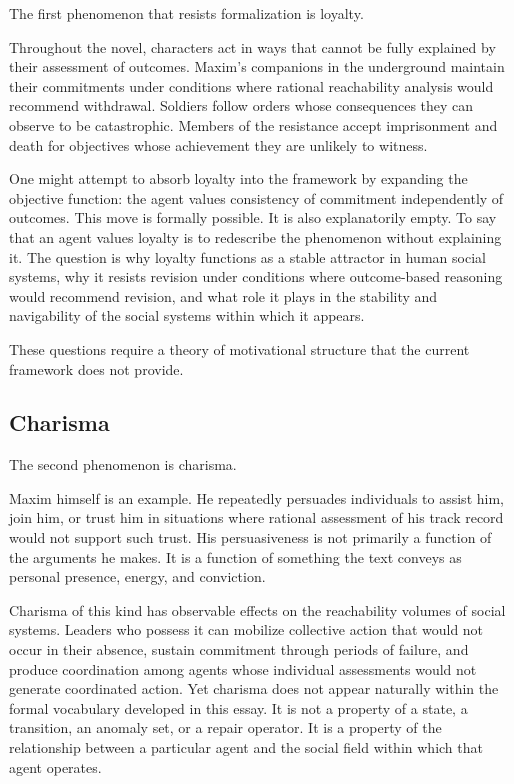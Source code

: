 \documentclass[12pt, a4paper]{article}
\theoremstyle{plain}
\theoremstyle{definition}
\theoremstyle{remark}
\begin{document}
The first phenomenon that resists formalization
is loyalty.

Throughout the novel, characters act in ways that
cannot be fully explained by their assessment of
outcomes. Maxim's companions in the underground
maintain their commitments under conditions where
rational reachability analysis would recommend
withdrawal. Soldiers follow orders whose
consequences they can observe to be catastrophic.
Members of the resistance accept imprisonment and
death for objectives whose achievement they are
unlikely to witness.

One might attempt to absorb loyalty into the
framework by expanding the objective function:
the agent values consistency of commitment
independently of outcomes. This move is formally
possible. It is also explanatorily empty. To say
that an agent values loyalty is to redescribe
the phenomenon without explaining it. The question
is why loyalty functions as a stable attractor in
human social systems, why it resists revision
under conditions where outcome-based reasoning
would recommend revision, and what role it plays
in the stability and navigability of the social
systems within which it appears.

These questions require a theory of motivational
structure that the current framework does not provide.

\subsection{Charisma}

The second phenomenon is charisma.

Maxim himself is an example. He repeatedly
persuades individuals to assist him, join him,
or trust him in situations where rational
assessment of his track record would not support
such trust. His persuasiveness is not primarily
a function of the arguments he makes. It is a
function of something the text conveys as personal
presence, energy, and conviction.

Charisma of this kind has observable effects on
the reachability volumes of social systems. Leaders
who possess it can mobilize collective action that
would not occur in their absence, sustain
commitment through periods of failure, and produce
coordination among agents whose individual
assessments would not generate coordinated action.
Yet charisma does not appear naturally within the
formal vocabulary developed in this essay. It is
not a property of a state, a transition, an
anomaly set, or a repair operator. It is a property
of the relationship between a particular agent and
the social field within which that agent operates.
\end{document}
